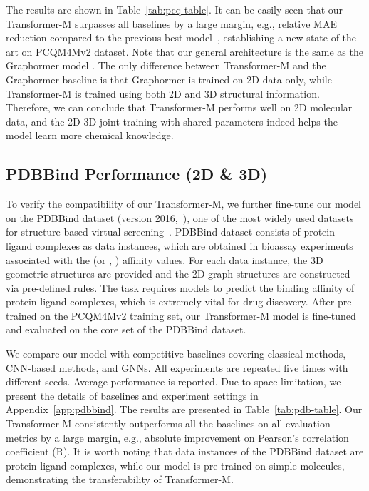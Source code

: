 \documentclass{article} \usepackage[dvipsnames]{xcolor}
\begin{document}
The results are shown in Table~\ref{tab:pcq-table}. It can be easily seen that our Transformer-M surpasses all baselines by a large margin, e.g.,  relative MAE reduction compared to the previous best model~\citep{rampavsek2022recipe}, establishing a new state-of-the-art on PCQM4Mv2 dataset. Note that our general architecture is the same as the Graphormer model \citep{ying2021transformers}. The only difference between Transformer-M and the Graphormer baseline is that Graphormer is trained on 2D data only, while Transformer-M is trained using both 2D and 3D structural information. Therefore, we can conclude that Transformer-M performs well on 2D molecular data, and the 2D-3D joint training with shared parameters indeed helps the model learn more chemical knowledge.
\vspace{-6pt}
\subsection{PDBBind Performance (2D \& 3D)}
\label{sec-exp-pdbbind}
\vspace{-6pt}
To verify the compatibility of our Transformer-M, we further fine-tune our model on the PDBBind dataset (version 2016,~\citet{wang2004pdbbind,wang2005pdbbind}), one of the most widely used datasets for structure-based virtual screening~\citep{jimenez2018k,stepniewska2018development,2019OnionNet}. PDBBind dataset consists of protein-ligand complexes as data instances, which are obtained in bioassay experiments associated with the  (or , ) affinity values. For each data instance, the 3D geometric structures are provided and the 2D graph structures are constructed via pre-defined rules. The task requires models to predict the binding affinity of protein-ligand complexes, which is extremely vital for drug discovery. After pre-trained on the PCQM4Mv2 training set, our Transformer-M model is fine-tuned and evaluated on the core set of the PDBBind dataset.

We compare our model with competitive baselines covering classical methods, CNN-based methods, and GNNs. All experiments are repeated five times with different seeds. Average performance is reported. Due to space limitation, we present the details of baselines and experiment settings in Appendix~\ref{app:pdbbind}. The results are presented in Table~\ref{tab:pdb-table}. Our Transformer-M consistently outperforms all the baselines on all evaluation metrics by a large margin, e.g.,  absolute improvement on Pearson's correlation coefficient (R). It is worth noting that data instances of the PDBBind dataset are protein-ligand complexes, while our model is pre-trained on simple molecules, demonstrating the transferability of Transformer-M.
\end{document}
